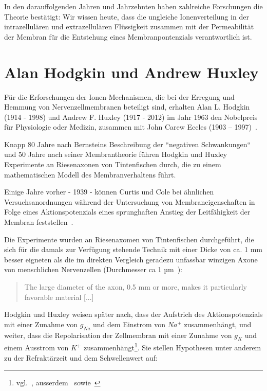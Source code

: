 In den darauffolgenden Jahren und Jahrzehnten haben zahlreiche Forschungen die Theorie bestätigt: Wir wissen heute, dass die ungleiche Ionenverteilung in der intrazellulären und extrazellulären Flüssigkeit zusammen mit der Permeabilität der Membran für die Entstehung eines Membranpontenzials verantwortlich ist.

\section{Alan Hodgkin und Andrew Huxley}\label{appendix:hodgkinhuxley}

Für die Erforschungen der Ionen-Mechanismen, die bei der Erregung und Hemmung von Nervenzellmembranen beteiligt sind, erhalten Alan L. Hodgkin (1914 - 1998) und Andrew F. Huxley (1917 - 2012) im Jahr 1963 den Nobelpreis für Physiologie oder Medizin, zusammen mit John Carew Eccles (1903 – 1997)~\cite{Gle09}.

Knapp 80 Jahre nach Bernsteins Beschreibung der ``negativen Schwankungen`` und 50 Jahre nach seiner Membrantheorie führen Hodgkin und Huxley Experimente an Riesenaxonen von Tintenfischen durch, die zu einem mathematischen Modell des Membranverhaltens führt.

Einige Jahre vorher - 1939 - können Curtis und Cole bei ähnlichen Versuchsanordnungen während der Untersuchung von Membraneigenschaften in Folge eines Aktionspotenzials eines sprunghaften Anstieg der Leitfähigkeit der Membran feststellen~\cite[669]{CC39}.

Die Experimente wurden an Riesenaxomen von Tintenfischen durchgeführt, die sich für die damals zur Verfügung stehende Technik mit einer Dicke von ca. 1 mm besser eigneten als die im direkten Vergleich geradezu unfassbar winzigen Axone von menschlichen Nervenzellen (Durchmesser ca 1 µm~\cite[79]{Jon19}):

\blockquote[{\cite[650]{CC39}}]{
    The large diameter of the axon, 0.5 mm or more, makes it particularly favorable material {[...]}
}

Hodgkin und Huxley weisen später nach, dass der Aufstrich des Aktionspotenzials mit einer Zunahme von $g_{Na}$ und dem Einstrom von $Na^+$ zusammenhängt, und weiter, dass die Repolarisation der Zellmembran mit einer Zunahme von $g_K$ und einem Ausstrom von $K^+$ zusammenhängt\footnote{
    vgl.~\cite[75]{Jon19}, ausserdem~\cite[96]{BCP18} sowie~\cite[530 Fig. 17]{HH52}
}.
Sie stellen Hypothesen unter anderem zu der Refraktärzeit und dem Schwellenwert auf:\\

